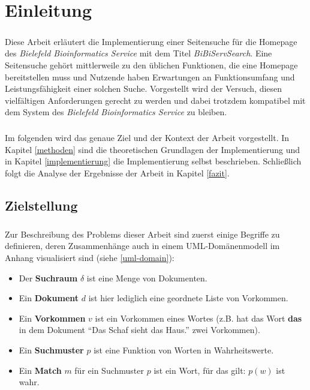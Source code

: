 \chapter{Einleitung}

\paragraph{} Diese Arbeit erläutert die Implementierung einer Seitensuche für die Homepage des \textit{Bielefeld Bioinformatics Service} mit dem Titel \textit{BiBiServSearch}. Eine Seitensuche gehört mittlerweile zu den üblichen Funktionen, die eine Homepage bereitstellen muss und Nutzende haben Erwartungen an Funktionsumfang und Leistungsfähigkeit einer solchen Suche. Vorgestellt wird der Versuch, diesen vielfältigen Anforderungen gerecht zu werden und dabei trotzdem kompatibel mit dem System des \textit{Bielefeld Bioinformatics Service} zu bleiben.
\paragraph{} Im folgenden wird das genaue Ziel und der Kontext der Arbeit vorgestellt. In Kapitel \ref{methoden} sind die theoretischen Grundlagen der Implementierung und in Kapitel \ref{implementierung} die Implementierung selbst beschrieben. Schließlich folgt die Analyse der Ergebnisse der Arbeit in Kapitel \ref{fazit}.

\section{Zielstellung}

\paragraph{} Zur Beschreibung des Problems dieser Arbeit sind zuerst einige Begriffe zu definieren, deren Zusammenhänge auch in einem UML-Domänenmodell im Anhang visualisiert sind (siehe \ref{uml-domain}):
\begin{itemize}
 \item Der \textbf{Suchraum} $\delta$ ist eine Menge von Dokumenten.
 \item Ein \textbf{Dokument} $d$ ist hier lediglich eine geordnete Liste von Vorkommen.
 \item Ein \textbf{Vorkommen} $v$ ist ein Vorkommen eines Wortes (z.B. hat das Wort \textbf{das} in dem Dokument "`Das Schaf sieht das Haus."' zwei Vorkommen).
 \item Ein \textbf{Suchmuster} $p$ ist eine Funktion von Worten in Wahrheitswerte.
 \item Ein \textbf{Match} $m$ für ein Suchmuster $p$ ist ein Wort, für das gilt: $p(w)$ ist wahr.
\end{itemize}

